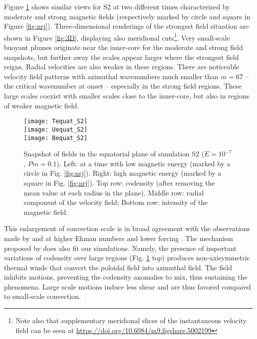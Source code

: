 \documentclass[12pt, a4paper]{article}
\begin{document}
Figure \ref{fig:equat_S2} shows similar views for S2 at two different times characterized by moderate and strong magnetic fields (respectively marked by circle and square in Figure \ref{fig:nrj}).
Three-dimensional renderings of the strongest field situation are shown in Figure \ref{fig:3D}, displaying also meridional cuts\footnote{Note also that supplementary meridional slices of the instantaneous velocity field can be seen at \url{https://doi.org/10.6084/m9.figshare.5002199}}.
Very small-scale buoyant plumes originate near the inner-core for the moderate and strong field snapshots, but further away the scales appear larger where the strongest field reigns.
Radial velocities are also weaker in these regions.
There are noticeable velocity field patterns with azimuthal wavenumbers much smaller than $m=67$ -- the critical wavenumber at onset -- especially in the strong field regions.
These large scales coexist with smaller scales close to the inner-core, but also in regions of weaker magnetic field.


\begin{figure}
\begin{center}
\texttt{[image: Tequat\_S2]} \\[2mm]
\texttt{[image: Uequat\_S2]} \\[2mm]
\texttt{[image: Bequat\_S2]}
\caption{Snapshot of fields in the equatorial plane of simulation S2 ($E=10^{-7}$, $Pm=0.1$).
Left: at a time with low magnetic energy (marked by a circle in Fig. \ref{fig:nrj}). Right: high magnetic energy (marked by a square in Fig. \ref{fig:nrj}).
Top row: codensity (after removing the mean value at each radius in the plane). Middle row: radial component of the velocity field; Bottom row: intensity of the magnetic field.
}
\label{fig:equat_S2}
\end{center}
\end{figure}



This enlargement of convection scale %
is in broad agreement with the observations made by \citet{matsui2014} and \citet{yadav2016b} at higher Ekman numbers and lower forcing \citep[see also][]{hori2012}.
The mechanism proposed by \citet{matsui2014} does also fit our simulations.
Namely, the presence of important variations of codensity over large regions (Fig. \ref{fig:equat_S2} top) produces non-axisymmetric thermal winds that convert the poloidal field into azimuthal field.
The field inhibits motions, preventing the codensity anomalies to mix, thus sustaining the phenomena.
Large scale motions induce less shear and are thus favored compared to small-scale convection.
\end{document}
